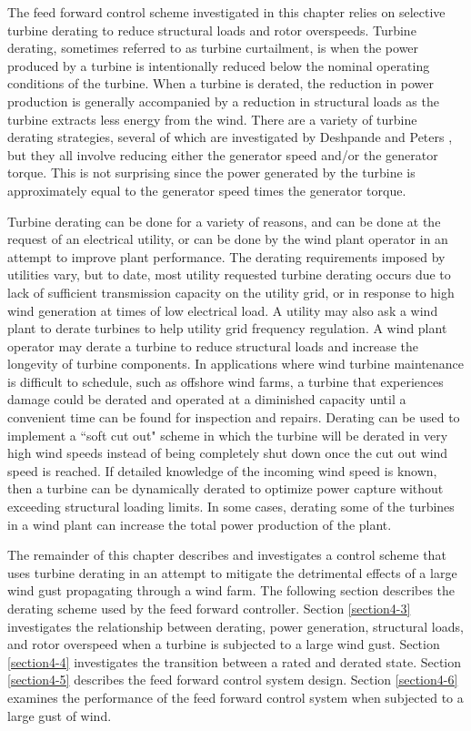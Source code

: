 The feed forward control scheme investigated in this chapter relies on selective turbine derating to reduce structural loads and rotor overspeeds. Turbine derating, sometimes referred to as turbine curtailment, is when the power produced by a turbine is intentionally reduced below the nominal operating conditions of the turbine. When a turbine is derated, the reduction in power production is generally accompanied by a reduction in structural loads as the turbine extracts less energy from the wind. There are a variety of turbine derating strategies, several of which are investigated by Deshpande and Peters \cite{deshpande2012}, but they all involve reducing either the generator speed and/or the generator torque. This is not surprising since the power generated by the turbine is approximately equal to the generator speed times the generator torque.

Turbine derating can be done for a variety of reasons, and can be done at the request of an electrical utility, or can be done by the wind plant operator in an attempt to improve plant performance. The derating requirements imposed by utilities vary, but to date, most utility requested turbine derating occurs due to lack of sufficient transmission capacity on the utility grid, or in response to high wind generation at times of low electrical load.\cite{fink2009} A utility may also ask a wind plant to derate turbines to help utility grid frequency regulation.\cite{aho2012,aho2013} A wind plant operator may derate a turbine to reduce structural loads and increase the longevity of turbine components.\cite{biegel2013} In applications where wind turbine maintenance is difficult to schedule, such as offshore wind farms, a turbine that experiences damage could be derated and operated at a diminished capacity until a convenient time can be found for inspection and  repairs.\cite{richards2014,griffith2015} Derating can be used to implement a ``soft cut out" scheme in which the turbine will be derated in very high wind speeds instead of being completely shut down once the cut out wind speed is reached. \cite{jelavic2013} If detailed knowledge of the incoming wind speed is known, then a turbine can be dynamically derated to optimize power capture without exceeding structural loading limits.\cite{petrovic2014,petrovic2015,jelavic2013} In some cases, derating some of the turbines in a wind plant can increase the total power production of the plant.\cite{carlen2010} 
 
 The remainder of this chapter describes and investigates a control scheme that uses turbine derating in an attempt to mitigate the detrimental effects of a large wind gust propagating through a wind farm. The following section describes the derating scheme used by the feed forward controller. Section \ref{section4-3} investigates the relationship between derating, power generation, structural loads, and rotor overspeed when a turbine is subjected to a large wind gust. Section \ref{section4-4} investigates the transition between a rated and derated state. Section \ref{section4-5} describes the feed forward control system design. Section \ref{section4-6} examines the performance of the feed forward control system when subjected to a large gust of wind. 


